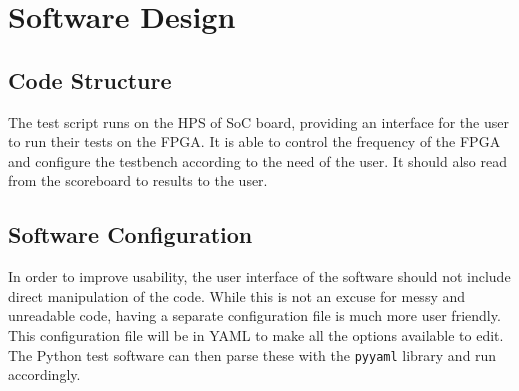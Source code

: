 \chapter{Software Design}

\section{Code Structure}
The test script runs on the HPS of SoC board, providing an interface for the user to run their tests on the FPGA.
It is able to control the frequency of the FPGA and configure the testbench according to the need of the user.
It should also read from the scoreboard to results to the user.



\section{Software Configuration}
In order to improve usability, the user interface of the software should not include direct manipulation of the code.
While this is not an excuse for messy and unreadable code, having a separate configuration file is much more user friendly.
This configuration file will be in YAML to make all the options available to edit.
The Python test software can then parse these with the \texttt{pyyaml} library and run accordingly.

